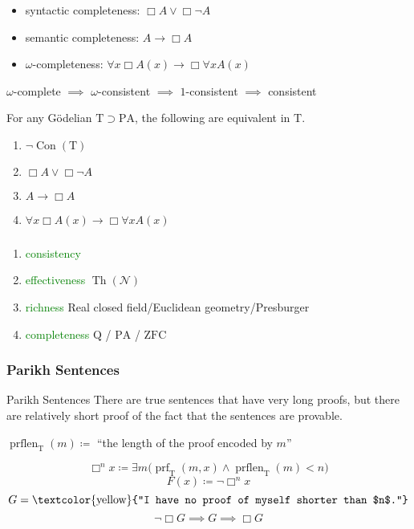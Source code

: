 \documentclass[UTF8,11pt,colorlinks,compress,openany]{beamer}%
\begin{document}
\begin{frame}\frametitle{}
	\begin{itemize}
		\item syntactic completeness: $\Box A\vee\Box \neg A$
		\item semantic completeness: $A\to\Box A$
		\item $\omega$-completeness: $\forall x\Box A(x)\to\Box \forall x A(x)$
	\end{itemize}
	\begin{center}
		$\omega$-complete $\implies$ $\omega$-consistent $\implies$ $1$-consistent $\implies$ consistent
	\end{center}
	\begin{theorem}
		For any G\"odelian $\mathrm{T}\supset \mathrm{PA} $, the following are equivalent in $\mathrm{T}$.
		\begin{enumerate}
			\item $\neg\operatorname{Con}(\mathrm{T})$
			\item $\Box A\vee\Box \neg A$
			\item $A\to\Box A$
			\item $\forall x\Box A(x)\to\Box \forall x A(x)$
		\end{enumerate}
	\end{theorem}
\end{frame}

\begin{frame}\frametitle{\hyperlink{hilbert-program}{}}
\label{incompatibility}
\begin{block}{}
			\begin{enumerate}
				\item \textcolor{green}{consistency}
				\item \textcolor{green}{effectiveness} $\operatorname{Th}(\mathcal{N})$
				\item \textcolor{green}{richness} Real closed field/Euclidean geometry/Presburger
				\item \textcolor{green}{completeness} $\mathrm{Q}$ / $\mathrm{PA}$ / $\mathrm{ZFC}$
			\end{enumerate}
\end{block}
\end{frame}

\begin{frame}\frametitle{Parikh Sentences}
	\begin{block}{Parikh Sentences}
		There are true sentences that have very long proofs, but there are relatively short proof of the fact that the sentences are provable.
		\begin{center}
			$\operatorname{prflen}_\mathrm{T}(m)\coloneqq $ ``the length of the proof encoded by $m$''
		\end{center}
		\[\Box ^n x\coloneqq \exists m\big(\operatorname{prf}_\mathrm{T}(m,x)\wedge\operatorname{prflen}_\mathrm{T}(m)<n\big)\]
		\[F(x)\coloneqq \neg\Box ^n x\]
		\[G=\text{\textcolor{yellow}{``I have no proof of myself shorter than $n$.''}}\]		
		\[\neg\Box G\implies G\implies\Box G\]
	\end{block}
\end{frame}
\end{document}
